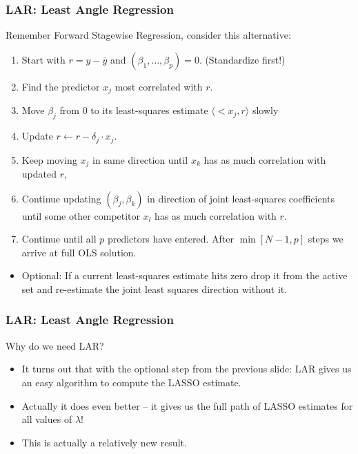 \begin{frame}
\frametitle{LAR: Least Angle Regression}
Remember Forward Stagewise Regression, consider this alternative:
\begin{enumerate}
\item Start with $r= y-\overline{y}$ and $(\beta_1, \ldots, \beta_p) = 0$. (Standardize first!)
\item Find the predictor $x_j$ most correlated with $r$.
\item Move $\beta_j$ from 0 to its least-squares estimate $\langle<x_j , r \rangle$ slowly
\item Update $r \leftarrow r - \delta_j \cdot x_j$.
\item Keep moving $x_j$ in same direction until $x_k$ has as much correlation with updated $r$,
\item Continue updating $(\beta_j, \beta_k)$ in direction of \alert{joint} least-squares coefficients until some other competitor $x_l$ has as much correlation with $r$.
\item Continue until all $p$ predictors have entered. After $\min[N-1,p]$ steps we arrive at full OLS solution.
\end{enumerate}
\begin{itemize}
\item \alert{Optional:} If a current least-squares estimate hits zero drop it from the active set and re-estimate the joint least squares direction without it.
\end{itemize}
\end{frame}


\begin{frame}
\frametitle{LAR: Least Angle Regression}
Why do we need LAR?
\begin{itemize}
\item It turns out that with the optional step from the previous slide: LAR gives us an easy algorithm to compute the LASSO estimate.
\item Actually it does even better -- it gives us the full path of LASSO estimates for all values of $\lambda$!
\item This is actually a relatively new result.
\end{itemize}
\end{frame}


